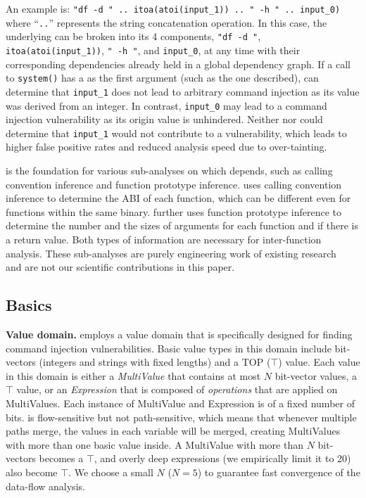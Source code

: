 An example \richexpr is: \texttt{"df -d " .. itoa(atoi(input\_1)) .. " -h " .. input\_0)} where ``\texttt{..}'' represents the string concatenation operation.
In this case, the underlying \richexpr can be broken into its 4 components, \texttt{"df -d "}, \texttt{itoa(atoi(input\_1))}, \texttt{" -h "}, and \texttt{input\_0}, at any time with their corresponding dependencies already held in a global dependency graph.
If a call to \texttt{system()} has a \richexpr as the first argument (such as the one described), \mango can determine that \texttt{input\_1} does not lead to arbitrary command injection as its value was derived from an integer.
In contrast, \texttt{input\_0} may lead to a command injection vulnerability as its origin value is unhindered.
Neither \karonte nor \satc could determine that \texttt{input\_1} would not contribute to a vulnerability, which leads to higher false positive rates and reduced analysis speed due to over-tainting.

\rda is the foundation for various sub-analyses on which \mango depends, such as calling convention inference and function prototype inference.
    \mango uses calling convention inference to determine the ABI of each function, which can be different even for functions within the same binary.
    \mango further uses function prototype inference to determine the number and the sizes of arguments for each function and if there is a return value.
    Both types of information are necessary for inter-function analysis.
    These sub-analyses are purely engineering work of existing research~\cite{balakrishnan2004analyzing,zhang2007parameter} and are not our scientific contributions in this paper.

\subsection{\rda Basics}

\noindent
\textbf{Value domain.}
\rda employs a value domain that is specifically designed for finding command injection vulnerabilities.
Basic value types in this domain include bit-vectors (integers and strings with fixed lengths) and a TOP ($\top$) value.
Each value in this domain is either a \emph{MultiValue} that contains at most $N$ bit-vector values, a $\top$ value, or an \emph{Expression} that is composed of \emph{operations} that are applied on MultiValues.
Each instance of MultiValue and Expression is of a fixed number of bits.
\rda is flow-sensitive but not path-sensitive, which means that whenever multiple paths merge, the values in each variable will be merged, creating MultiValues with more than one basic value inside.
A MultiValue with more than $N$ bit-vectors becomes a $\top$, and overly deep expressions (we empirically limit it to 20) also become $\top$.
We choose a small $N$ ($N=5$) to guarantee fast convergence of the data-flow analysis.

